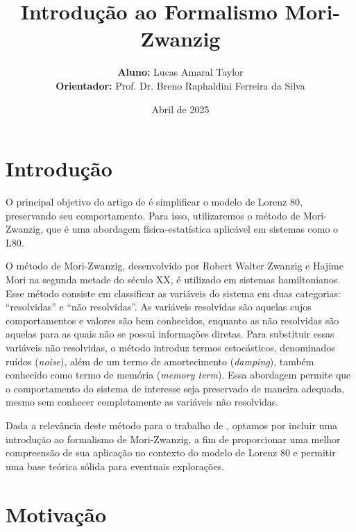 \documentclass[12pt]{article}
\title{Introdução ao Formalismo Mori-Zwanzig}
\date{Abril de 2025}
\author{
    \textbf{Aluno:} Lucas Amaral Taylor\\
    \textbf{Orientador:} Prof. Dr. Breno Raphaldini Ferreira da Silva
}
\begin{document}
\maketitle

\section{Introdução}
O principal objetivo do artigo de \citet{Chekroun2021} é simplificar o modelo de Lorenz 80, preservando seu comportamento. Para isso, utilizaremos o método de Mori-Zwanzig, que é uma abordagem física-estatística aplicável em sistemas como o L80.

O método de Mori-Zwanzig, desenvolvido por Robert Walter Zwanzig e Hajime Mori na segunda metade do século XX, é utilizado em sistemas hamiltonianos. Esse método consiste em classificar as variáveis do sistema em duas categorias: ``resolvidas'' e ``não resolvidas''. As variáveis resolvidas são aquelas cujos comportamentos e valores são bem conhecidos, enquanto as não resolvidas são aquelas para as quais não se possui informações diretas. Para substituir essas variáveis não resolvidas, o método introduz termos estocásticos, denominados ruídos (\textit{noise}), além de um termo de amortecimento (\textit{damping}), também conhecido como termo de memória (\textit{memory term}). Essa abordagem permite que o comportamento do sistema de interesse seja preservado de maneira adequada, mesmo sem conhecer completamente as variáveis não resolvidas.

Dada a relevância deste método para o trabalho de \citet{Chekroun2021}, optamos por incluir uma introdução ao formalismo de Mori-Zwanzig, a fim de proporcionar uma melhor compreensão de sua aplicação no contexto do modelo de Lorenz 80 e permitir uma base teórica sólida para eventuais explorações.

\section{Motivação}
\end{document}
